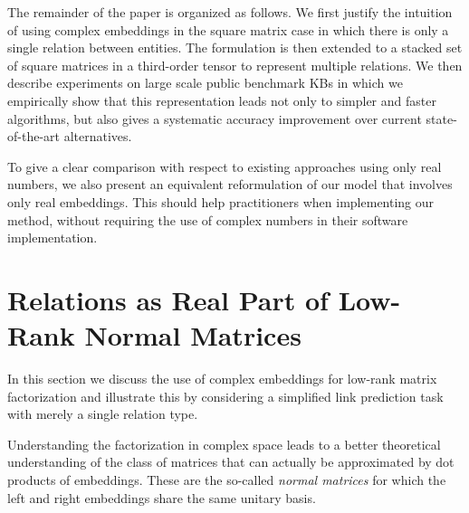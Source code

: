 \documentclass{article}
\begin{document}
The remainder of the paper is organized as follows. We first justify the intuition of using complex embeddings in the square matrix case in which there is only a single relation between entities. The formulation is then extended to a stacked set of square matrices in a third-order tensor to represent multiple relations. We then describe experiments on large scale public benchmark KBs in which we empirically show that this representation leads not only to simpler and faster algorithms, but also gives a systematic accuracy improvement over current state-of-the-art alternatives.



To give a clear comparison with respect to existing approaches using only real numbers, we also present an equivalent reformulation of our model that involves only real embeddings. This should help practitioners when implementing our method, without requiring the use of complex numbers in their software implementation.













\section{Relations as Real Part of Low-Rank Normal Matrices}
In this section we discuss the use of complex embeddings for low-rank matrix factorization and illustrate this by \mbox{considering} a simplified link prediction task with merely a single relation type. 

Understanding the factorization in complex space leads to a better theoretical understanding of the class of matrices that can actually be approximated by dot products of embeddings. These are the so-called \emph{normal matrices} for which the left and  right embeddings share the same unitary basis. 
\end{document}
